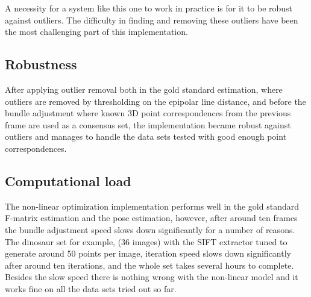 A necessity for a system like this one to work in practice is for it to be robust against outliers. The difficulty in finding and removing these outliers have been the most challenging part of this implementation.

\subsection{Robustness}
After applying outlier removal both in the gold standard estimation, where outliers are removed by thresholding on the epipolar line distance, and before the bundle adjustment where known 3D point correspondences from the previous frame are used as a consensus set, the implementation became robust against outliers and manages to handle the data sets tested with good enough point correspondences. 

\subsection{Computational load}
The non-linear optimization implementation performs well in the gold standard F-matrix estimation and the pose estimation, however, after around ten frames the bundle adjustment speed slows down significantly for a number of reasons. The dinosaur set for example, (36 images) with the SIFT extractor tuned to generate around 50 points per image, iteration speed slows down significantly after around ten iterations, and the whole set takes several hours to complete. Besides the slow speed there is nothing wrong with the non-linear model and it works fine on all the data sets tried out so far.